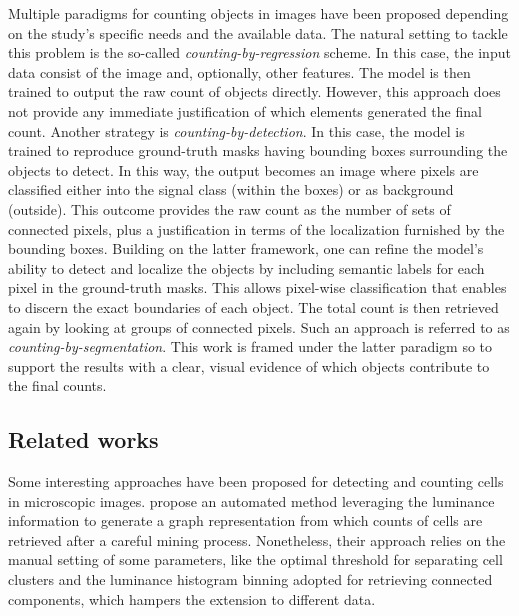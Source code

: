 Multiple paradigms for counting objects in images have been proposed depending on the study's specific needs and the available data.
The natural setting to tackle this problem is the so-called \textit{counting-by-regression} scheme. 
In this case, the input data consist of the image and, optionally, other features. 
The model is then trained to output the raw count of objects directly. However, this approach does not provide any immediate justification of which elements generated the final count.
Another strategy is \textit{counting-by-detection}.
In this case, the model is trained to reproduce ground-truth masks having bounding boxes surrounding the objects to detect. 
In this way, the output becomes an image where pixels are classified either into the signal class (within the boxes) or as background (outside). 
This outcome provides the raw count as the number of sets of connected pixels, plus a justification in terms of the localization furnished by the bounding boxes. 
Building on the latter framework, one can refine the model's ability to detect and localize the objects by including semantic labels for each pixel in the ground-truth masks. This allows pixel-wise classification that enables to discern the exact boundaries of each object. The total count is then retrieved again by looking at groups of connected pixels. Such an approach is referred to as \textit{counting-by-segmentation}.
This work is framed under the latter paradigm so to support the results with a clear, visual evidence of which objects contribute to the final counts.

\subsection{Related works}
\label{sec:related_works}

Some interesting approaches have been proposed for detecting and counting cells in microscopic images.
 propose an automated method leveraging the luminance information to generate a graph representation from which counts of cells are retrieved after a careful mining process. Nonetheless, their approach relies on the manual setting of some parameters, like the optimal threshold for separating cell clusters and the luminance histogram binning adopted for retrieving connected components, which hampers the extension to different data.

